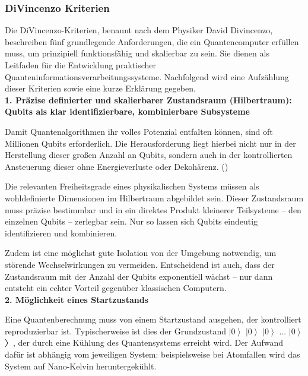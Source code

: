 \cite{nielsen_quantum_2010}


\subsubsection{DiVincenzo Kriterien}

Die DiVincenzo-Kriterien, benannt nach dem Physiker David Divincenzo, beschreiben fünf grundlegende Anforderungen, die ein Quantencomputer erfüllen muss, um prinzipiell funktionsfähig und skalierbar zu sein. Sie dienen als Leitfaden für die Entwicklung praktischer Quanteninformationsverarbeitungssysteme. Nachfolgend wird eine Aufzählung dieser Kriterien sowie eine kurze Erklärung gegeben. \\

\textbf{1. Präzise definierter und skalierbarer Zustandsraum (Hilbertraum): Qubits als klar identifizierbare, kombinierbare Subsysteme} 

Damit Quantenalgorithmen ihr volles Potenzial entfalten können, sind oft Millionen Qubits erforderlich. Die Herausforderung liegt hierbei nicht nur in der Herstellung dieser großen Anzahl an Qubits, sondern auch in der kontrollierten Ansteuerung dieser ohne Energieverluste oder Dekohärenz. 
(\cite{lapierre_introduction_2021})

Die relevanten Freiheitsgrade eines physikalischen Systems müssen als wohldefinierte Dimensionen im Hilbertraum abgebildet sein. Dieser Zustandsraum muss präzise bestimmbar und in ein direktes Produkt kleinerer Teilsysteme – den einzelnen Qubits – zerlegbar sein. Nur so lassen sich Qubits eindeutig identifizieren und kombinieren.

Zudem ist eine möglichst gute Isolation von der Umgebung notwendig, um störende Wechselwirkungen zu vermeiden. Entscheidend ist auch, dass der Zustandsraum mit der Anzahl der Qubits exponentiell wächst – nur dann entsteht ein echter Vorteil gegenüber klassischen Computern.
 \\

\textbf{{2. Möglichkeit eines Startzustands} }

Eine Quantenberechnung muss von einem Startzustand ausgehen, der kontrolliert reproduzierbar ist. Typischerweise ist dies der Grundzustand \(\left| 0\right\rangle\) \(\left| 0\right\rangle\) \(\left| 0\right\rangle\) ... \(\left| 0\right\rangle\)〉, der durch eine Kühlung des Quantensystems erreicht wird.  Der Aufwand dafür ist abhängig vom jeweiligen System: beispielsweise bei Atomfallen wird das System auf Nano-Kelvin heruntergekühlt. 

